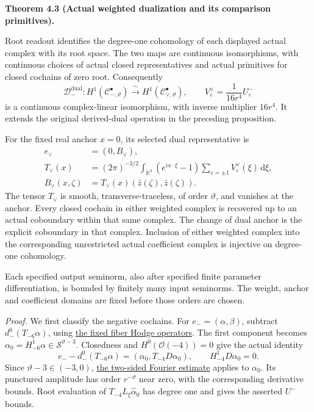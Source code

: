 \documentclass[
  english,
  11pt,
  reqno]{amsart}
\makeatletter
\newcommand{\pandocstatementheading}[1]{%
  \par\if@nobreak\else
    \addpenalty{\@beginparpenalty}%
    \addvspace{.5\baselineskip plus .2\baselineskip minus .2\baselineskip}%
  \fi
  {\normalfont\bfseries #1\par}%
  \nobreak\@afterindenttrue\@afterheading
}
\makeatother
\begin{document}
\pandocstatementheading{\leavevmode{}\label{thm:online-actual-weighted-negative-dual}Theorem 4.3 (Actual weighted dualization and its comparison primitives).}

Root readout identifies the degree-one cohomology of each displayed
actual complex with its root space. The two maps are continuous
isomorphisms, with continuous choices of actual closed representatives
and actual primitives for closed cochains of zero root. Consequently%
 \[
\mathcal D_-^{\mathrm{dual}}:
H^1(\mathscr C_{-,\vartheta}^{\bullet})
\xrightarrow{\ \sim\ }
H^1(\mathscr C_{\vee,\vartheta}^{\bullet}),
\qquad
V^\vee_\varepsilon=\frac1{16r^4}U^-_\varepsilon
\] is a continuous complex-linear isomorphism, with inverse multiplier
\(16r^4\). It extends the original derived-dual operation in the
preceding proposition.

For the fixed real anchor \(x=0\), its selected dual representative is%
 \[
\begin{aligned}
e_\vee&=(0,B_\vee),\\
T_\vee(x)
&=(2\pi)^{-3/2}\int_{\mathbb R^3}
 (e^{ix\cdot\xi}-1)
 \sum_{\varepsilon=\pm1}V^\vee_\varepsilon(\xi)
 \,\mathrm d\xi,\\
B_\vee(x,\zeta)&=T_\vee(x)(\bar z(\zeta),\bar z(\zeta)).
\end{aligned}
\] The tensor \(T_\vee\) is smooth, transverse-traceless, of order
\(\vartheta\), and vanishes at the anchor. Every closed cochain in
either weighted complex is recovered up to an actual coboundary within
that same complex. The change of dual anchor is the explicit coboundary
in that complex. Inclusion of either weighted complex into the
corresponding unrestricted actual coefficient complex is injective on
degree-one cohomology.

Each specified output seminorm, also after specified finite parameter
differentiation, is bounded by finitely many input seminorms. The
weight, anchor and coefficient domains are fixed before those orders are
chosen.

\emph{Proof.} We first classify the negative cochains. For
\(e_-=(\alpha,\beta)\), subtract \(d_-^0(T_{-6}\alpha)\), using
\hyperref[eq:online-root-fiber-homotopy]{the fixed fiber Hodge
operators}. The first component becomes
\(\alpha_0=H^1_{-6}\alpha\in\mathscr S^{\vartheta-3}\). Closedness and
\(H^0(\mathcal O(-4))=0\) give the actual identity%
\[
e_--d_-^0(T_{-6}\alpha)
=(\alpha_0,T_{-4}D\alpha_0),
\qquad H^1_{-4}D\alpha_0=0 .
\] Since \(\vartheta-3\in(-3,0)\),
\hyperref[lem:online-decay-fourier-isomorphism]{the two-sided Fourier
estimate} applies to \(\alpha_0\). Its punctured amplitude has order
\(r^{-\vartheta}\) near zero, with the corresponding derivative bounds.
Root evaluation of \(T_{-4}L_\xi\widehat\alpha_0\) has degree one and
gives the asserted \(U^-\) bounds.
\end{document}
